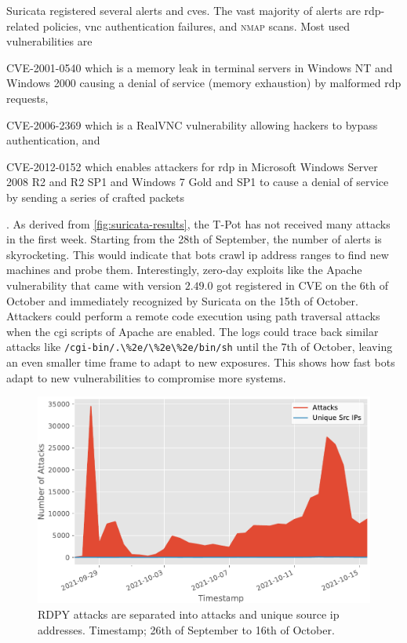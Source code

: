 Suricata registered several alerts and \acsp{cve}.
The vast majority of alerts are \ac{rdp}-related policies, \ac{vnc} authentication failures, and \textsc{nmap} scans.
Most used vulnerabilities are
\begin{enumerate*}[label=(\roman*)]
    \item CVE-2001-0540\cite{CVE-2001-0540} which is a memory leak in terminal servers in Windows NT and Windows 2000 causing a denial of service (memory exhaustion) by malformed \ac{rdp} requests,
    \item CVE-2006-2369\cite{CVE-2006-2369} which is a RealVNC vulnerability allowing hackers to bypass authentication, and
    \item CVE-2012-0152\cite{CVE-2012-0152} which enables attackers for \ac{rdp} in Microsoft Windows Server 2008 R2 and R2 SP1 and Windows 7 Gold and SP1 to cause a denial of service by sending a series of crafted packets
\end{enumerate*}.
As derived from \autoref{fig:suricata-results}, the T-Pot has not received many attacks in the first week.
Starting from the 28th of September, the number of alerts is skyrocketing.
This would indicate that bots crawl \ac{ip} address ranges to find new machines and probe them.
Interestingly, zero-day exploits like the Apache vulnerability \cite{CVE-2021-42013} that came with version $2.49.0$ got registered in CVE on the 6th of October and immediately recognized by Suricata on the 15th of October.
Attackers could perform a remote code execution using path traversal attacks when the \ac{cgi} scripts of Apache are enabled.
The logs could trace back similar attacks like \verb|/cgi-bin/.\%2e/\%2e\%2e/bin/sh| until the 7th of October, leaving an even smaller time frame to adapt to new exposures.
This shows how fast bots adapt to new vulnerabilities to compromise more systems.

\begin{figure}
    \centering
    \includegraphics[width=\textwidth]{figures/tpot-rdpy-port.pdf}
    \caption[RDPY results of T-Pot]{
        RDPY attacks are separated into attacks and unique source \ac{ip} addresses.
        Timestamp; 26th of September to 16th of October.
    }
    \label{fig:rdpy-results}
\end{figure}

